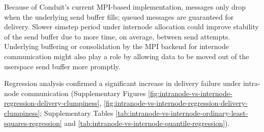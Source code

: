 Because of Conduit's current MPI-based implementation, messages only drop when the underlying send buffer fills; queued messages are guaranteed for delivery.
Slower simstep period under internode allocation could improve stability of the send buffer due to more time, on average, between send attempts.
Underlying buffering or consolidation by the MPI backend for internode communication might also play a role by allowing data to be moved out of the userspace send buffer more promptly.

Regression analysis confirmed a significant increase in delivery failure under intra-node communication (Supplementary Figures \ref{fig:intranode-vs-internode-regression-delivery-clumpiness}, \ref{fig:intranode-vs-internode-regression-delivery-clumpiness}; Supplementary Tables \ref{tab:intranode-vs-internode-ordinary-least-squares-regression} and \ref{tab:intranode-vs-internode-quantile-regression}).
